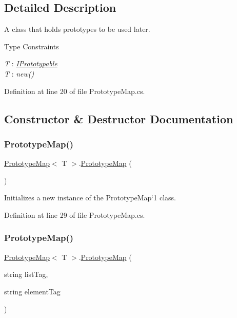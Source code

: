 \subsection{Detailed Description}
A class that holds prototypes to be used later. 

\begin{Desc}
\item[Type Constraints]\begin{description}
\item[{\em T} : {\em \hyperlink{interface_i_prototypable}{I\+Prototypable}}]\item[{\em T} : {\em new()}]\end{description}
\end{Desc}


Definition at line 20 of file Prototype\+Map.\+cs.



\subsection{Constructor \& Destructor Documentation}
\mbox{\label{class_prototype_map_a980e1783fc0a6997a7266e91a507e38b}} 
\subsubsection{\texorpdfstring{Prototype\+Map()}{PrototypeMap()}\hspace{0.1cm}{\footnotesize\ttfamily [1/2]}}
{\footnotesize\ttfamily \hyperlink{class_prototype_map}{Prototype\+Map}$<$ T $>$.\hyperlink{class_prototype_map}{Prototype\+Map} (\begin{DoxyParamCaption}{ }\end{DoxyParamCaption})}



Initializes a new instance of the Prototype\+Map`1 class. 



Definition at line 29 of file Prototype\+Map.\+cs.

\mbox{\label{class_prototype_map_af3d81ed7fda9fd1293bf3f3da095c477}} 
\subsubsection{\texorpdfstring{Prototype\+Map()}{PrototypeMap()}\hspace{0.1cm}{\footnotesize\ttfamily [2/2]}}
{\footnotesize\ttfamily \hyperlink{class_prototype_map}{Prototype\+Map}$<$ T $>$.\hyperlink{class_prototype_map}{Prototype\+Map} (\begin{DoxyParamCaption}\item[{string}]{list\+Tag,  }\item[{string}]{element\+Tag }\end{DoxyParamCaption})}



